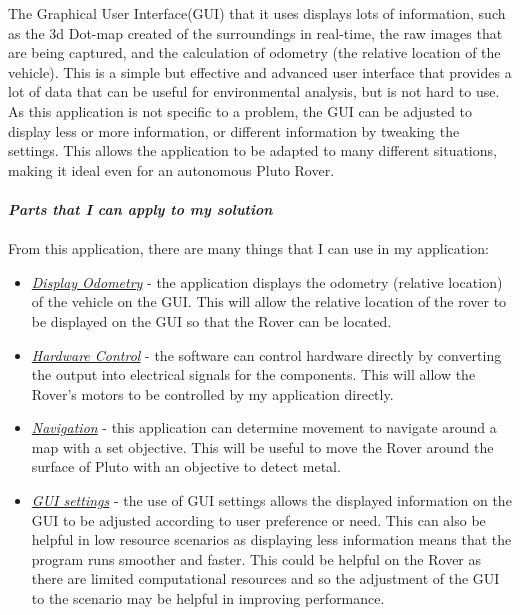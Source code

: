 \documentclass[11pt]{report}
\begin{document}
\begin{itemize}
				The Graphical User Interface(GUI) that it uses displays lots of information, such as the 3d Dot-map created of the surroundings in real-time, the raw images that are being captured, and the calculation of odometry (the relative location of the vehicle). This is a simple but effective and advanced user interface that provides a lot of data that can be useful for environmental analysis, but is not hard to use. As this application is not specific to a problem, the GUI can be adjusted to display less or more information, or different information by tweaking the settings. This allows the application to be adapted to many different situations, making it ideal even for an autonomous Pluto Rover.  
				\\
				\\\emph{\textbf{Parts that I can apply to my solution}}
				\\\\
				From this application, there are many things that I can use in my application:
					\begin{itemize}
						\item{\underline{\emph{Display Odometry}}} - the application displays the odometry (relative location) of the vehicle on the GUI. This will allow the relative location of the rover to be displayed on the GUI so that the Rover can be located.
						\item{\underline{\emph{Hardware Control}}} - the software can control hardware directly by converting the output into electrical signals for the components. This will allow the Rover's motors to be controlled by my application directly.
						\item{\underline{\emph{Navigation}}} - this application can determine movement to navigate around a map with a set objective. This will be useful to move the Rover around the surface of Pluto with an objective to detect metal.
						\item{\underline{\emph{GUI settings}}} - the use of GUI settings allows the displayed information on the GUI to be adjusted according to user preference or need. This can also be helpful in low resource scenarios as displaying less information means that the program runs smoother and faster. This could be helpful on the Rover as there are limited computational resources and so the adjustment of the GUI to the scenario may be helpful in improving performance.  
					\end{itemize}
				\newpage
	

\end{itemize}
\end{document}
